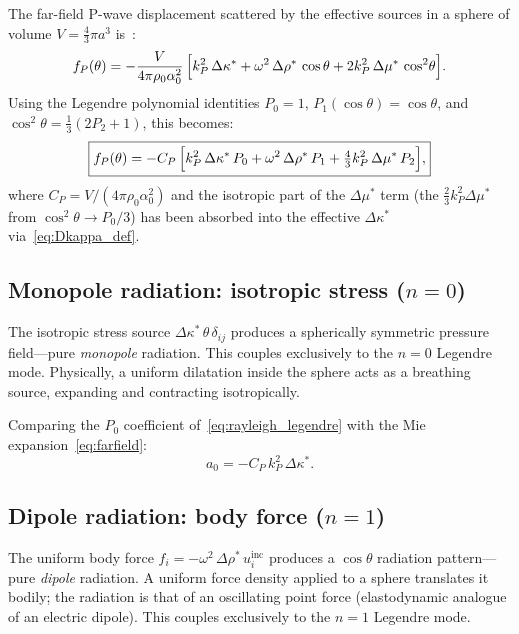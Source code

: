 \documentclass[11pt,a4paper]{article}
\newcommand{\Dmu}{\Delta\mu}
\newcommand{\Drho}{\Delta\rho}
\newcommand{\Dkappa}{\Delta\kappa}
\begin{document}
The far-field P-wave displacement scattered by the effective sources
in a sphere of volume $V = \tfrac{4}{3}\pi a^3$
is~\cite{AkiRichards2002,GubernatisDomanyKrumhansl1977}:
\begin{equation}
  f_P(\theta) = -\frac{V}{4\pi\rho_0\alpha_0^2}\,\Bigl[
    k_P^2\,\Dkappa^*
    + \omega^2\,\Drho^*\,\cos\theta
    + 2k_P^2\,\Dmu^*\,\cos^2\!\theta
  \Bigr].
  \label{eq:rayleigh_f}
\end{equation}
Using the Legendre polynomial identities $P_0 = 1$,
$P_1(\cos\theta) = \cos\theta$, and
$\cos^2\!\theta = \tfrac{1}{3}(2P_2 + 1)$, this becomes:
\begin{equation}
  \boxed{
  f_P(\theta) = -C_P\,\Bigl[
    k_P^2\,\Dkappa^*\,P_0
    + \omega^2\,\Drho^*\,P_1
    + \tfrac{4}{3}k_P^2\,\Dmu^*\,P_2
  \Bigr],
  }
  \label{eq:rayleigh_legendre}
\end{equation}
where $C_P = V/(4\pi\rho_0\alpha_0^2)$ and the isotropic part of
the $\Dmu^*$ term (the $\tfrac{2}{3}k_P^2\Dmu^*$ from
$\cos^2\!\theta \to P_0/3$) has been absorbed into the effective
$\Dkappa^*$ via~\eqref{eq:Dkappa_def}.

\subsection{Monopole radiation: isotropic stress \texorpdfstring{($n = 0$)}{(n=0)}}

The isotropic stress source $\Dkappa^*\,\theta\,\delta_{ij}$
produces a spherically symmetric pressure field---pure
\emph{monopole} radiation.  This couples exclusively to the $n = 0$
Legendre mode.  Physically, a uniform dilatation inside the sphere
acts as a breathing source, expanding and contracting isotropically.

Comparing the $P_0$ coefficient of~\eqref{eq:rayleigh_legendre}
with the Mie expansion~\eqref{eq:farfield}:
\begin{equation}
  a_0 = -C_P\,k_P^2\,\Dkappa^*.
  \label{eq:a0_match}
\end{equation}

\subsection{Dipole radiation: body force \texorpdfstring{($n = 1$)}{(n=1)}}

The uniform body force $f_i = -\omega^2\,\Drho^*\,u_i^\text{inc}$
produces a $\cos\theta$ radiation pattern---pure \emph{dipole}
radiation.  A uniform force density applied to a sphere translates
it bodily; the radiation is that of an oscillating point force
(elastodynamic analogue of an electric dipole).  This couples
exclusively to the $n = 1$ Legendre mode.
\end{document}
